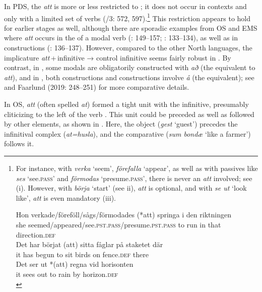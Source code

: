 \documentclass[output=paper]{langscibook}
\begin{document}
In PDS, the  \textit{att} is more or less restricted to ; it does not occur in  contexts and only with a limited set of  verbs (\citealt{TelemanEtAl1999}/3: 572, 597).\footnote{For instance, with \textit{verka} ‘seem’, \textit{förefalla} ‘appear’, as well as with passives like \textit{ses} ‘see.\textsc{pass}’ and \textit{förmodas} ‘presume.\textsc{pass}’, there is never an \textit{att} involved; see (i). However, with \textit{börja} ‘start’ (see ii), \textit{att} is optional, and with \textit{se ut} ‘look like’, \textit{att} is even mandatory (iii).

\ea \gll Hon   verkade/föreföll/sågs/förmodades     (*att)   springa   i    den   riktningen\\
        she   seemed/appeared/see\textsc{.pst.pass}/presume\textsc{.pst.pass} to     run     in   that   direction\textsc{.def}\\

\ex \gll Det   har börjat (att)   sitta   fåglar   på staketet     där\\
         it   has begun to   sit     birds   on fence\textsc{.def}   there\\
         
\ex \gll Det   ser     ut   *(att)   regna   vid   horisonten\\
    it   sees     out to     rain     by   horizon.\textsc{def}\\
\z} 
This restriction appears to hold for earlier stages as well, although there are sporadic examples from OS and EMS where \textit{att} occurs in the  of a modal verb (\citealt{Lagervall2014}: 149--157; \citealt{Kalm2016Satsekvivalenta}: 133–134), as well as in  constructions (\citealt{Kalm2016Satsekvivalenta}: 136–137). However, compared to the other North  languages, the implicature \textit{att}\,+\,infinitive → control infinitive seems fairly robust in . By contrast, in , some modals are obligatorily constructed with \textit{að} (the  equivalent to \textit{att}), and in , both  constructions and  constructions involve \textit{å} (the  equivalent); see \citet[45]{Kalm2016Satsekvivalenta} and Faarlund (2019: 248–251) for more comparative details.



In OS, \textit{att} (often spelled \textit{at}) formed a tight unit with the infinitive, presumably cliticizing to the left of the verb \citep{Falk2010Studier}. This unit could be preceded as well as followed by other elements, as shown in . Here, the object (\textit{gest} ‘guest’) precedes the infinitival complex (\textit{at=husla}), and the comparative  (\textit{sum bondæ} ‘like a farmer’) follows it.
\end{document}
